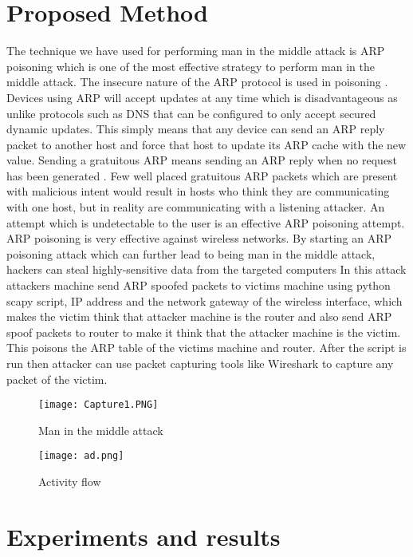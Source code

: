 \documentclass[11pt]{article}
\begin{document}
\section{Proposed Method}
The technique we have used  for performing man in the middle attack is ARP poisoning which is one of the most effective strategy to perform man in the middle attack.
The insecure nature of the ARP protocol is used in poisoning . Devices using ARP will accept updates at any time which is disadvantageous as unlike protocols such as DNS that can be configured to only accept secured dynamic updates. This simply means  that any device can send an ARP reply packet to another host and force that host to update its ARP cache with the new value. 
Sending a gratuitous ARP means sending an ARP reply when no request has been generated . Few well placed gratuitous ARP packets which are present with malicious intent would result in hosts who think they are communicating with one host, but in reality are communicating with a listening attacker.
An attempt which is undetectable to the user is an effective ARP poisoning attempt. ARP poisoning is very effective against wireless networks. By starting an ARP poisoning attack which can further lead to being man in the middle attack, hackers can steal highly-sensitive data from the targeted computers
In this attack attackers machine send ARP spoofed packets to victims machine using python scapy script, IP address and the network gateway of the wireless interface, which makes the victim think that attacker machine is the router and also send ARP spoof packets to router to make it think that the attacker machine is the victim. This poisons the ARP table of the victims machine and router. After the script is run then attacker can use packet capturing tools like Wireshark to capture any packet of the victim.

\begin{figure}[h]
\centering
\texttt{[image: Capture1.PNG]}
\caption{Man in the middle attack}
\label{fig:universe}
\end{figure}


\begin{figure}[h!]
\centering
\texttt{[image: ad.png]}
\caption{Activity flow}
\label{fig:universe}
\end{figure}

\newpage
\section{Experiments and results}
\end{document}
